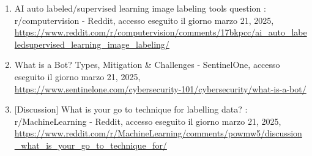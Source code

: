 \documentclass[
  12pt,
  letterpaper,
  DIV=11,
  numbers=noendperiod]{scrartcl}
\begin{document}
\begin{enumerate}
\item
  AI auto labeled/supervised learning image labeling tools question :
  r/computervision - Reddit, accesso eseguito il giorno marzo 21, 2025,
  \url{https://www.reddit.com/r/computervision/comments/17bkpcc/ai_auto_labeledsupervised_learning_image_labeling/}\\
\item
  What is a Bot? Types, Mitigation \& Challenges - SentinelOne, accesso
  eseguito il giorno marzo 21, 2025,
  \url{https://www.sentinelone.com/cybersecurity-101/cybersecurity/what-is-a-bot/}\\
\item
  {[}Discussion{]} What is your go to technique for labelling data? :
  r/MachineLearning - Reddit, accesso eseguito il giorno marzo 21, 2025,
  \url{https://www.reddit.com/r/MachineLearning/comments/powmw5/discussion_what_is_your_go_to_technique_for/}
\end{enumerate}
\end{document}
